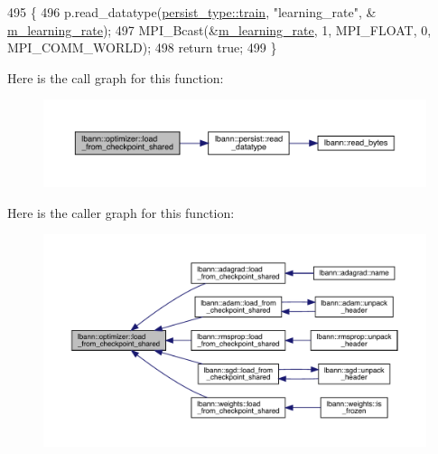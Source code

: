 \begin{DoxyCode}
495                                                                         \{
496   p.read\_datatype(\hyperlink{namespacelbann_adee41f31f15f3906cbdcce4a1417eb56a61b3a8faa9c1091806675c230a9abe64}{persist\_type::train}, \textcolor{stringliteral}{"learning\_rate"}, &
      \hyperlink{classlbann_1_1optimizer_ad393dcdcb82b44510c586ed5ec46d4dd}{m\_learning\_rate});
497   MPI\_Bcast(&\hyperlink{classlbann_1_1optimizer_ad393dcdcb82b44510c586ed5ec46d4dd}{m\_learning\_rate}, 1, MPI\_FLOAT, 0, MPI\_COMM\_WORLD);
498   \textcolor{keywordflow}{return} \textcolor{keyword}{true};
499 \}
\end{DoxyCode}
Here is the call graph for this function\+:\nopagebreak
\begin{figure}[H]
\begin{center}
\leavevmode
\includegraphics[width=350pt]{classlbann_1_1optimizer_a42a52aab9a682fda57c1e639968a44b9_cgraph}
\end{center}
\end{figure}
Here is the caller graph for this function\+:\nopagebreak
\begin{figure}[H]
\begin{center}
\leavevmode
\includegraphics[width=350pt]{classlbann_1_1optimizer_a42a52aab9a682fda57c1e639968a44b9_icgraph}
\end{center}
\end{figure}
\mbox{\label{classlbann_1_1optimizer_ab7811e0a4d2d9b594140aed78b6de743}} 
